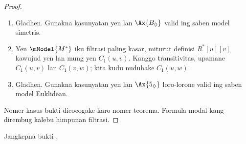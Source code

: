 \documentclass[../../../include/open-logic-section]{subfiles}
\begin{document}
\begin{proof}
\begin{enumerate}
  \item Gladhen. Gunakna kasunyatan yen  lan $\Ax{B_\Diamond}$
    valid ing saben model simetris.
  \item Yen $\mModel{M^*}$ iku filtrasi paling kasar, miturut definisi
    $R^*[u][v]$ kawujud yen lan mung yen $C_1(u,v)$. Kanggo transitivitas,
    upamane $C_1(u,v)$ lan $C_1(v,w)$; kita kudu nuduhake
    $C_1(u,w)$. 
  \item Gladhen. Gunakna kasunyatan yen  lan $\Ax{5_\Diamond}$
    loro-lorone valid ing saben model Euklidean.
\end{enumerate}
Nomer kasus bukti dicocogake karo nomer teorema. Formula modal kang dirembug kalebu himpunan filtrasi.
\end{proof}

\begin{prob}
  Jangkepna bukti .
\end{prob}
\end{document}
